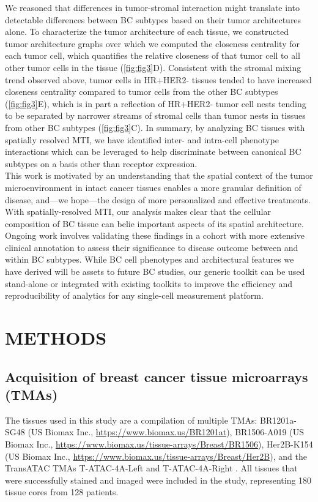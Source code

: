 \documentclass[preprint,review,3p,12pt]{elsarticle}
\begin{document}
We reasoned that differences in tumor-stromal interaction might translate into detectable differences between BC subtypes based on their tumor architectures alone. To characterize the tumor architecture of each tissue, we constructed tumor architecture graphs over which we computed the closeness centrality for each tumor cell, which quantifies the relative closeness of that tumor cell to all other tumor cells in the tissue (\autoref{fig:fig3}D). Consistent with the stromal mixing trend observed above, tumor cells in HR+HER2- tissues tended to have increased closeness centrality compared to tumor cells from the other BC subtypes (\autoref{fig:fig3}E), which is in part a reflection of HR+HER2- tumor cell nests tending to be separated by narrower streams of stromal cells than tumor nests in tissues from other BC subtypes (\autoref{fig:fig3}C). In summary, by analyzing BC tissues with spatially resolved MTI, we have identified inter- and intra-cell phenotype interactions which can be leveraged to help discriminate between canonical BC subtypes on a basis other than receptor expression. \\

This work is motivated by an understanding that the spatial context of the tumor microenvironment in intact cancer tissues enables a more granular definition of disease, and—we hope—the design of more personalized and effective treatments. With spatially-resolved MTI, our analysis makes clear that the cellular composition of BC tissue can belie important aspects of its spatial architecture. Ongoing work involves validating these findings in a cohort with more extensive clinical annotation to assess their significance to disease outcome between and within BC subtypes. While BC cell phenotypes and architectural features we have derived will be assets to future BC studies, our generic toolkit can be used stand-alone or integrated with existing toolkits \cite{histocat2017} to improve the efficiency and reproducibility of analytics for any single-cell measurement platform.

\section{METHODS}
\subsection{Acquisition of breast cancer tissue microarrays (TMAs)}
The tissues used in this study are a compilation of multiple TMAs: BR1201a-SG48 (US Biomax Inc., \url{https://www.biomax.us/BR1201at}), BR1506-A019 (US Biomax Inc., \url{https://www.biomax.us/tissue-arrays/Breast/BR1506}), Her2B-K154 (US Biomax Inc., \url{https://www.biomax.us/tissue-arrays/Breast/Her2B}), and the TransATAC TMAs T-ATAC-4A-Left and T-ATAC-4A-Right \cite{tatac2008}. All tissues that were successfully stained and imaged were included in the study, representing 180 tissue cores from 128 patients.
\end{document}
